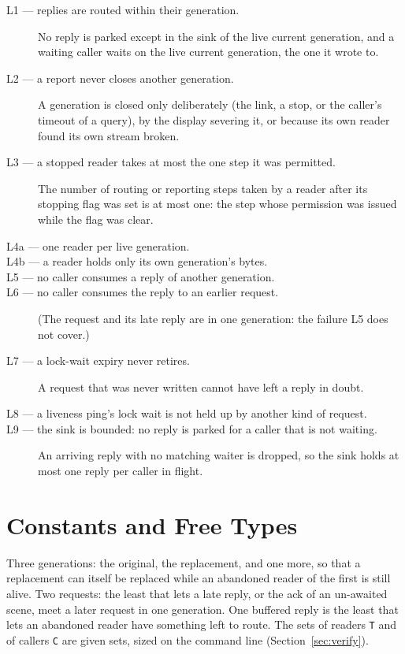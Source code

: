 \documentclass[a4paper,10pt,fleqn]{article}
\begin{document}
\begin{description}
  \item[L1 --- replies are routed within their generation.] No reply is
    parked except in the sink of the live current generation, and a waiting
    caller waits on the live current generation, the one it wrote to.
  \item[L2 --- a report never closes another generation.] A generation is
    closed only deliberately (the link, a stop, or the caller's timeout of a
    query), by the display severing it, or because its own reader found its own stream broken.
  \item[L3 --- a stopped reader takes at most the one step it was
    permitted.]  The number of routing or reporting steps taken by a reader
    after its stopping flag was set is at most one: the step whose permission
    was issued while the flag was clear.
  \item[L4a --- one reader per live generation.]
  \item[L4b --- a reader holds only its own generation's bytes.]
  \item[L5 --- no caller consumes a reply of another generation.]
  \item[L6 --- no caller consumes the reply to an earlier request.]  (The
    request and its late reply are in one generation: the failure L5 does not
    cover.)
  \item[L7 --- a lock-wait expiry never retires.]  A request that was never
    written cannot have left a reply in doubt.
  \item[L8 --- a liveness ping's lock wait is not held up by another kind of
    request.]
  \item[L9 --- the sink is bounded: no reply is parked for a caller that is not
    waiting.]  An arriving reply with no matching waiter is dropped, so the
    sink holds at most one reply per caller in flight.
\end{description}

\section{Constants and Free Types}

Three generations: the original, the replacement, and one more, so that a
replacement can itself be replaced while an abandoned reader of the first is
still alive.  Two requests: the least that lets a late reply, or the ack of an
un-awaited scene, meet a later request in one generation.  One buffered reply
is the least that lets an abandoned reader have something left to route.  The
sets of readers \texttt{T} and of callers \texttt{C} are given sets, sized on
the command line (Section~\ref{sec:verify}).
\end{document}
